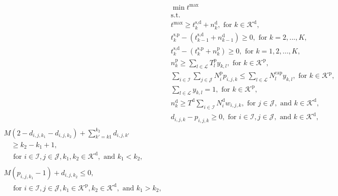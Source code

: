 \begin{align}
    \label{obj:makespan}
    & \min t^\text{max} \\
    & \nonumber \text{s.t.} \\
    \label{cst:makespan_def}
    & t^\text{max} \geq t^\text{s,d}_{k} + n^\text{d}_{k}, \text{ for } k \in \mathcal{K}^\text{d}, \\
    \label{cst:bin_def_2}
    & t^\text{s,p}_{k} - \left(t^\text{s,d}_{k-1} + n^\text{d}_{k-1}\right) \geq 0, \text{ for } k = 2,...,K,\\
    \label{cst:bin_def_3}
    & t^\text{s,d}_{k} - \left(t^\text{s,p}_{k} + n^\text{p}_{k}\right) \geq 0, \text{ for } k = 1,2,...,K,\\
    \label{cst:prefill_length_def_1}
    & n^\text{p}_{k} \geq \sum_{l \in \mathcal{L}} T^\text{p}_l y_{k,l}, \text{ for } k \in \mathcal{K}^\text{p},\\
    \label{cst:prefill_length_def_2}
    & \sum_{i \in \mathcal{I}} \sum_{j \in \mathcal{J}} N^\text{p}_i p_{i,j,k} \leq \sum_{l \in \mathcal{L}} N^\text{cap}_l y_{k,l}, \text{ for } k \in \mathcal{K}^\text{p},\\ 
    \label{cst:level_def}
    & \sum_{l \in \mathcal{L}} y_{k,l} = 1,  \text{ for } k \in \mathcal{K}^\text{p}, \\
    \label{cst:decode_length_def_1}
    & n^\text{d}_{k} \geq T^\text{d} \sum_{i\in \mathcal{I}} N_i^\text{d} w_{i,j,k}, \text{ for }j \in \mathcal{J}, \text{ and } k \in \mathcal{K}^\text{d},\\
    \label{cst:immediate_prefill_decode}
    & d_{i,j,k} - p_{i,j,k} \geq 0, \text{ for }i \in \mathcal{I}, j \in \mathcal{J}, \text{ and } k \in \mathcal{K}^\text{d}, \\
    \label{cst:consecutive_decode_bin}
    \begin{split}
    &M\left(2 - d_{i,j,k_1} - d_{i,j,k_2}\right) + \sum_{k'=k1}^{k_2} d_{i,j,k'} \\ 
    &\quad \geq k_2 - k_1 + 1, \\
    &\quad \text{ for }i \in \mathcal{I}, j \in \mathcal{J}, k_1,k_2 \in \mathcal{K}^\text{d},\text{ and }k_1<k_2, 
    \end{split} \\
    \label{cst:prefill-decode-order}
    \begin{split}
    & M\left(p_{i,j,k_1}-1\right) +d_{i,j,k_2} \leq 0, \\
    &\quad \text{ for }i \in \mathcal{I}, j \in \mathcal{J}, k_1 \in \mathcal{K}^\text{p},k_2\in \mathcal{K}^\text{d}, \text{ and }k_1 > k_2, 

\end{split}
\end{align}
